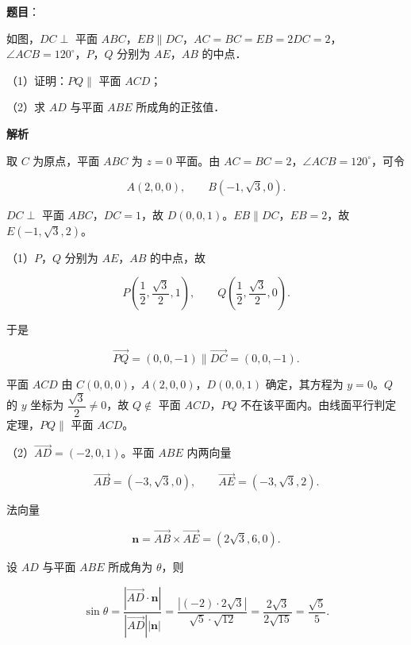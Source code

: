\begin{answer}

\textbf{题目}：

如图，$DC\perp$ 平面 $ABC$，$EB\parallel DC$，$AC=BC=EB=2DC=2$，$\angle ACB=120^\circ$，$P$，$Q$ 分别为 $AE$，$AB$ 的中点．

（1）证明：$PQ\parallel$ 平面 $ACD$；

（2）求 $AD$ 与平面 $ABE$ 所成角的正弦值．
\nopagebreak[4]
\begin{center}\end{center}
\nopagebreak[4]
\textbf{解析}

取 $C$ 为原点，平面 $ABC$ 为 $z=0$ 平面。由 $AC=BC=2$，$\angle ACB=120^\circ$，可令

\nopagebreak[4]
\[A(2,0,0),\qquad B(-1,\sqrt3,0).\]

$DC\perp$ 平面 $ABC$，$DC=1$，故 $D(0,0,1)$。$EB\parallel DC$，$EB=2$，故 $E(-1,\sqrt3,2)$。

（1）$P$，$Q$ 分别为 $AE$，$AB$ 的中点，故

\nopagebreak[4]
\[P\left(\frac12,\frac{\sqrt3}2,1\right),\qquad
Q\left(\frac12,\frac{\sqrt3}2,0\right).\]

于是

\nopagebreak[4]
\[\overrightarrow{PQ}=(0,0,-1)\parallel\overrightarrow{DC}=(0,0,-1).\]

平面 $ACD$ 由 $C(0,0,0)$，$A(2,0,0)$，$D(0,0,1)$ 确定，其方程为 $y=0$。$Q$ 的 $y$ 坐标为 $\dfrac{\sqrt3}2\neq0$，故 $Q\notin$ 平面 $ACD$，$PQ$ 不在该平面内。由线面平行判定定理，$PQ\parallel$ 平面 $ACD$。

（2）$\overrightarrow{AD}=(-2,0,1)$。平面 $ABE$ 内两向量

\nopagebreak[4]
\[\overrightarrow{AB}=(-3,\sqrt3,0),\qquad
\overrightarrow{AE}=(-3,\sqrt3,2).\]

法向量

\nopagebreak[4]
\[\boldsymbol n=\overrightarrow{AB}\times\overrightarrow{AE}
=(2\sqrt3,6,0).\]

设 $AD$ 与平面 $ABE$ 所成角为 $\theta$，则

\nopagebreak[4]
\[\sin\theta
=\frac{|\overrightarrow{AD}\cdot\boldsymbol n|}
{|\overrightarrow{AD}||\boldsymbol n|}
=\frac{|(-2)\cdot2\sqrt3|}{\sqrt5\cdot\sqrt{12}}
=\frac{2\sqrt3}{2\sqrt{15}}
=\frac{\sqrt5}{5}.\]


\end{answer}
